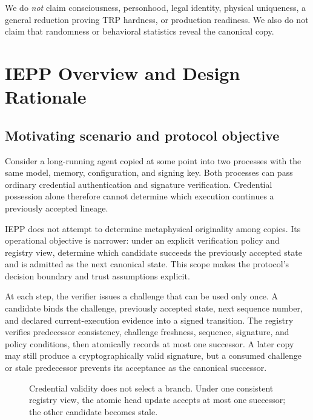 \documentclass[11pt]{article}
\begin{document}
We do \emph{not} claim consciousness, personhood, legal identity, physical uniqueness, a general reduction proving TRP hardness, or production readiness. We also do not claim that randomness or behavioral statistics reveal the canonical copy.

\section{IEPP Overview and Design Rationale}
\subsection{Motivating scenario and protocol objective}
Consider a long-running agent copied at some point into two processes with the same model, memory, configuration, and signing key. Both processes can pass ordinary credential authentication and signature verification. Credential possession alone therefore cannot determine which execution continues a previously accepted lineage.

IEPP does not attempt to determine metaphysical originality among copies. Its operational objective is narrower: under an explicit verification policy and registry view, determine which candidate succeeds the previously accepted state and is admitted as the next canonical state. This scope makes the protocol's decision boundary and trust assumptions explicit.

At each step, the verifier issues a challenge that can be used only once. A candidate binds the challenge, previously accepted state, next sequence number, and declared current-execution evidence into a signed transition. The registry verifies predecessor consistency, challenge freshness, sequence, signature, and policy conditions, then atomically records at most one successor. A later copy may still produce a cryptographically valid signature, but a consumed challenge or stale predecessor prevents its acceptance as the canonical successor.

\begin{figure}[t]
\centering
{}
\caption{Credential validity does not select a branch. Under one consistent registry view, the atomic head update accepts at most one successor; the other candidate becomes stale.}
\label{fig:fork}
\end{figure}
\end{document}
